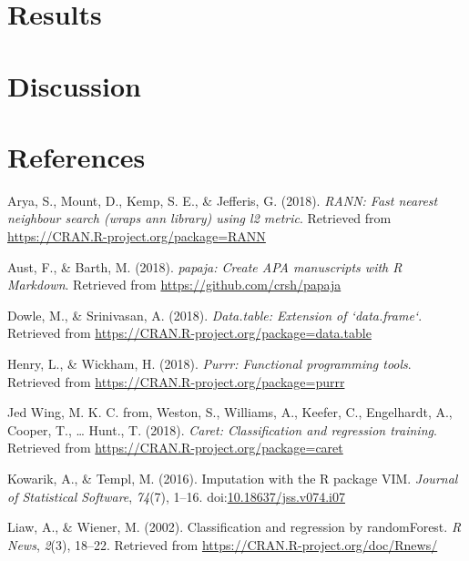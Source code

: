 \documentclass[man]{apa6}
\theoremstyle{definition}
\theoremstyle{definition}
\theoremstyle{definition}
\theoremstyle{remark}
\begin{document}
\section{Results}\label{results}

\section{Discussion}\label{discussion}

\newpage

\section{References}\label{references}

\begingroup
\setlength{\parindent}{-0.5in} \setlength{\leftskip}{0.5in}

\hypertarget{refs}{}
\hypertarget{ref-R-RANN}{}
Arya, S., Mount, D., Kemp, S. E., \& Jefferis, G. (2018). \emph{RANN:
Fast nearest neighbour search (wraps ann library) using l2 metric}.
Retrieved from \url{https://CRAN.R-project.org/package=RANN}

\hypertarget{ref-R-papaja}{}
Aust, F., \& Barth, M. (2018). \emph{papaja: Create APA manuscripts with
R Markdown}. Retrieved from \url{https://github.com/crsh/papaja}

\hypertarget{ref-R-data.table}{}
Dowle, M., \& Srinivasan, A. (2018). \emph{Data.table: Extension of
`data.frame`}. Retrieved from
\url{https://CRAN.R-project.org/package=data.table}

\hypertarget{ref-R-purrr}{}
Henry, L., \& Wickham, H. (2018). \emph{Purrr: Functional programming
tools}. Retrieved from \url{https://CRAN.R-project.org/package=purrr}

\hypertarget{ref-R-caret}{}
Jed Wing, M. K. C. from, Weston, S., Williams, A., Keefer, C.,
Engelhardt, A., Cooper, T., \ldots{} Hunt., T. (2018). \emph{Caret:
Classification and regression training}. Retrieved from
\url{https://CRAN.R-project.org/package=caret}

\hypertarget{ref-R-VIM}{}
Kowarik, A., \& Templ, M. (2016). Imputation with the R package VIM.
\emph{Journal of Statistical Software}, \emph{74}(7), 1--16.
doi:\href{https://doi.org/10.18637/jss.v074.i07}{10.18637/jss.v074.i07}

\hypertarget{ref-R-randomForest}{}
Liaw, A., \& Wiener, M. (2002). Classification and regression by
randomForest. \emph{R News}, \emph{2}(3), 18--22. Retrieved from
\url{https://CRAN.R-project.org/doc/Rnews/}
\end{document}
